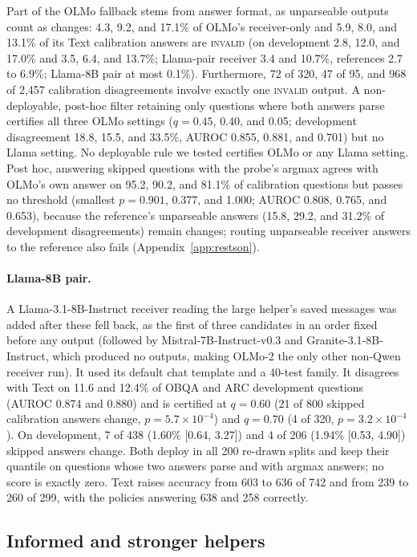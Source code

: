 Part of the OLMo fallback stems from answer format, as unparseable outputs count as changes: 4.3, 9.2, and 17.1\% of OLMo's receiver-only and 5.9, 8.0, and 13.1\% of its Text calibration answers are \textsc{invalid} (on development 2.8, 12.0, and 17.0\% and 3.5, 6.4, and 13.7\%; Llama-pair receiver 3.4 and 10.7\%, references 2.7 to 6.9\%; Llama-8B pair at most 0.1\%). Furthermore, 72 of 320, 47 of 95, and 968 of 2,457 calibration disagreements involve exactly one \textsc{invalid} output. A non-deployable, post-hoc filter retaining only questions where both answers parse certifies all three OLMo settings ($q=0.45$, 0.40, and 0.05; development disagreement 18.8, 15.5, and 33.5\%, AUROC 0.855, 0.881, and 0.701) but no Llama setting. No deployable rule we tested certifies OLMo or any Llama setting. Post hoc, answering skipped questions with the probe's argmax agrees with OLMo's own answer on 95.2, 90.2, and 81.1\% of calibration questions but passes no threshold (smallest $p=0.901$, 0.377, and 1.000; AUROC 0.808, 0.765, and 0.653), because the reference's unparseable answers (15.8, 29.2, and 31.2\% of development disagreements) remain changes; routing unparseable receiver answers to the reference also fails (Appendix~\ref{app:restson}).

\paragraph{Llama-8B pair.} A Llama-3.1-8B-Instruct receiver reading the large helper's saved messages was added after these fell back, as the first of three candidates in an order fixed before any output (followed by Mistral-7B-Instruct-v0.3 and Granite-3.1-8B-Instruct, which produced no outputs, making OLMo-2 the only other non-Qwen receiver run). It used its default chat template and a 40-test family. It disagrees with Text on 11.6 and 12.4\% of OBQA and ARC development questions (AUROC 0.874 and 0.880) and is certified at $q=0.60$ (21 of 800 skipped calibration answers change, $p=5.7\times10^{-4}$) and $q=0.70$ (4 of 320, $p=3.2\times10^{-4}$). On development, 7 of 438 (1.60\% [0.64, 3.27]) and 4 of 206 (1.94\% [0.53, 4.90]) skipped answers change. Both deploy in all 200 re-drawn splits and keep their quantile on questions whose two answers parse and with argmax answers; no score is exactly zero. Text raises accuracy from 603 to 636 of 742 and from 239 to 260 of 299, with the policies answering 638 and 258 correctly.

\subsection{Informed and stronger helpers}\label{app:informed}

